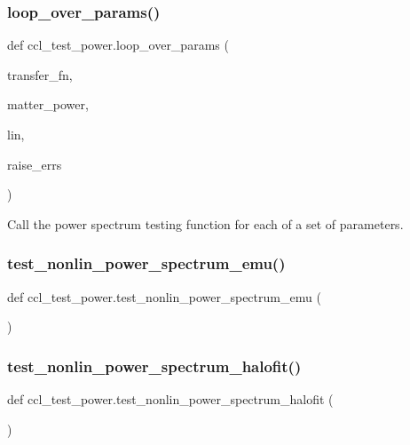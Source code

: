\subsubsection{\texorpdfstring{loop\+\_\+over\+\_\+params()}{loop\_over\_params()}}
{\footnotesize\ttfamily def ccl\+\_\+test\+\_\+power.\+loop\+\_\+over\+\_\+params (\begin{DoxyParamCaption}\item[{}]{transfer\+\_\+fn,  }\item[{}]{matter\+\_\+power,  }\item[{}]{lin,  }\item[{}]{raise\+\_\+errs }\end{DoxyParamCaption})}

\begin{DoxyVerb}Call the power spectrum testing function for each of a set of parameters.
\end{DoxyVerb}
 \mbox{\label{namespaceccl__test__power_a4d6ab9bc4f6987e0c4cae1e6ad4f7134}} 
\subsubsection{\texorpdfstring{test\+\_\+nonlin\+\_\+power\+\_\+spectrum\+\_\+emu()}{test\_nonlin\_power\_spectrum\_emu()}}
{\footnotesize\ttfamily def ccl\+\_\+test\+\_\+power.\+test\+\_\+nonlin\+\_\+power\+\_\+spectrum\+\_\+emu (\begin{DoxyParamCaption}{ }\end{DoxyParamCaption})}

\mbox{\label{namespaceccl__test__power_a142d3f67b071ab1119a7edf3d2450916}} 
\subsubsection{\texorpdfstring{test\+\_\+nonlin\+\_\+power\+\_\+spectrum\+\_\+halofit()}{test\_nonlin\_power\_spectrum\_halofit()}}
{\footnotesize\ttfamily def ccl\+\_\+test\+\_\+power.\+test\+\_\+nonlin\+\_\+power\+\_\+spectrum\+\_\+halofit (\begin{DoxyParamCaption}{ }\end{DoxyParamCaption})}

